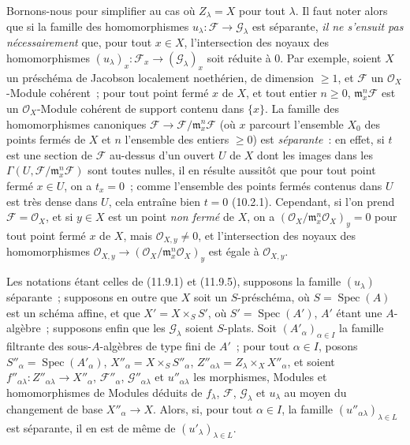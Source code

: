 \begin{remark}[11.9.11]
\label{IV.11.9.11-fr}
Bornons-nous pour simplifier au cas où $Z_\lambda=X$ pour tout $\lambda$. Il
faut noter alors que si la famille des homomorphismes
$u_\lambda:\mathcal F\to\mathcal G_\lambda$ est séparante, \emph{il ne
s'ensuit pas nécessairement} que, pour tout $x\in X$, l'intersection des
noyaux des homomorphismes
$(u_\lambda)_x:\mathcal F_x\to(\mathcal G_\lambda)_x$ soit réduite à 0. Par
exemple, soient $X$ un préschéma de Jacobson localement noethérien, de
dimension $\geq1$, et $\mathcal F$ un $\mathcal O_X$-Module cohérent~; pour
tout point fermé $x$ de $X$, et tout entier $n\geq0$,
$\mathfrak m_x^n\mathcal F$ est un $\mathcal O_X$-Module cohérent de support
contenu dans $\{x\}$. La famille des homomorphismes canoniques
$\mathcal F\to\mathcal F/\mathfrak m_x^n\mathcal F$ (où $x$ parcourt
l'ensemble $X_0$ des points fermés de $X$ et $n$ l'ensemble des entiers
$\geq0$) est \emph{séparante}~: en effet, si $t$ est une section de
$\mathcal F$ au-dessus d'un ouvert $U$ de $X$ dont les images dans les
$\Gamma(U,\mathcal F/\mathfrak m_x^n\mathcal F)$ sont toutes nulles, il en
résulte aussitôt que pour tout point fermé $x\in U$, on a $t_x=0$~; comme
l'ensemble des points fermés contenus dans $U$ est très dense dans $U$, cela
entraîne bien $t=0$ (10.2.1). Cependant, si l'on prend
$\mathcal F=\mathcal O_X$, et si $y\in X$ est un point \emph{non fermé} de
$X$, on a $(\mathcal O_X/\mathfrak m_x^n\mathcal O_X)_y=0$ pour tout point
fermé $x$ de $X$, mais $\mathcal O_{X,y}\neq0$, et l'intersection des noyaux
des homomorphismes
$\mathcal O_{X,y}\to(\mathcal O_X/\mathfrak m_x^n\mathcal O_X)_y$ est égale
à $\mathcal O_{X,y}$.
\end{remark}

\begin{lemma}[11.9.12]
\label{IV.11.9.12-fr}
Les notations étant celles de \textup{(11.9.1)} et \textup{(11.9.5)}, supposons la famille
$(u_\lambda)$ séparante~; supposons en outre que $X$ soit un $S$-préschéma, où
$S=\operatorname{Spec}(A)$ est un schéma affine, et que
$X'=X\times_S S'$, où $S'=\operatorname{Spec}(A')$, $A'$ étant une
$A$-algèbre~; supposons enfin que les $\mathcal G_\lambda$ soient $S$-\textup{plats}.
Soit $(A'_\alpha)_{\alpha\in I}$ la famille filtrante des sous-$A$-algèbres de
type fini de $A'$~; pour tout $\alpha\in I$, posons
$S''_\alpha=\operatorname{Spec}(A'_\alpha)$,
$X''_\alpha=X\times_S S''_\alpha$,
$Z''_{\alpha\lambda}=Z_\lambda\times_X X''_\alpha$, et soient
$f''_{\alpha\lambda}:Z''_{\alpha\lambda}\to X''_\alpha$,
$\mathcal F''_\alpha$, $\mathcal G''_{\alpha\lambda}$ et
$u''_{\alpha\lambda}$ les morphismes, Modules et homomorphismes de Modules
déduits de $f_\lambda$, $\mathcal F$, $\mathcal G_\lambda$ et $u_\lambda$ au
moyen du changement de base $X''_\alpha\to X$. Alors, si, pour tout
$\alpha\in I$, la famille $(u''_{\alpha\lambda})_{\lambda\in L}$ est
séparante, il en est de même de $(u'_\lambda)_{\lambda\in L}$.
\end{lemma}

